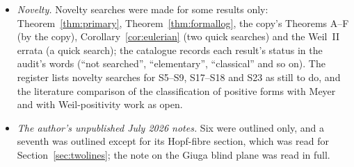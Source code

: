 \begin{itemize}
\item \emph{Novelty.} Novelty searches were made for some results only: Theorem~\ref{thm:primary}, Theorem~\ref{thm:formallog}, the copy's Theorems A--F (by the copy), Corollary~\ref{cor:eulerian} (two quick searches) and the Weil~II errata (a quick search); the catalogue records each result's status in the audit's words (``not searched'', ``elementary'', ``classical'' and so on). The register lists novelty searches for S5--S9, S17--S18 and S23 as still to do, and the literature comparison of the classification of positive forms with Meyer and with Weil-positivity work as open.
\item \emph{The author's unpublished July 2026 notes.} Six were outlined only, and a seventh was outlined except for its Hopf-fibre section, which was read for Section~\ref{sec:twolines}; the note on the Giuga blind plane was read in full.
\end{itemize}
